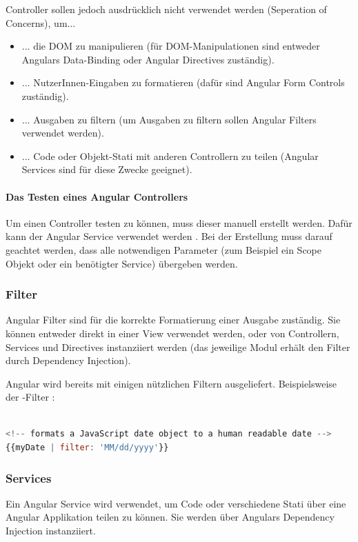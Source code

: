 Controller sollen jedoch ausdrücklich nicht verwendet werden (Seperation of Concerns), um...
\begin{itemize}
  \item ... die DOM zu manipulieren (für DOM-Manipulationen sind entweder Angulars Data-Binding oder Angular Directives zuständig).
  \item ... NutzerInnen-Eingaben zu formatieren (dafür sind Angular Form Controls \autocite[Forms]{Angular:DevGuide} zuständig).
  \item ... Ausgaben zu filtern (um Ausgaben zu filtern sollen Angular Filters verwendet werden).
  \item ... Code oder Objekt-Stati mit anderen Controllern zu teilen (Angular Services sind für diese Zwecke geeignet).
\end{itemize}

\paragraph{Das Testen eines Angular Controllers}
Um einen Controller testen zu können, muss dieser manuell erstellt werden. Dafür kann der Angular Service  verwendet werden \autocite[\$controller]{Angular:APIRef}. Bei der Erstellung muss darauf geachtet werden, dass alle notwendigen Parameter (zum Beispiel ein Scope Objekt oder ein benötigter Service) übergeben werden.

\subsubsection{Filter}
Angular Filter sind für die korrekte Formatierung einer Ausgabe zuständig. Sie können entweder direkt in einer View verwendet werden, oder von Controllern, Services und Directives instanziiert werden (das jeweilige Modul erhält den Filter durch Dependency Injection).

\newpage
Angular wird bereits mit einigen nützlichen Filtern ausgeliefert. Beispielsweise der -Filter \autocite[Filter/Date]{Angular:APIRef}:

\begin{lstlisting}[language=JavaScript, caption=AngularJS - Date-Filter]

<!-- formats a JavaScript date object to a human readable date -->
{{myDate | filter: 'MM/dd/yyyy'}}

\end{lstlisting}

\subsubsection{Services}
Ein Angular Service wird verwendet, um Code oder verschiedene Stati über eine Angular Applikation teilen zu können. Sie werden über Angulars Dependency Injection instanziiert.

